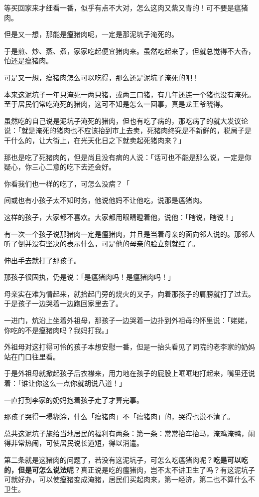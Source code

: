 \documentclass[UTF8]{ctexart}
\begin{document}
等买回家来才细看一番，似乎有点不大对，怎么这肉又紫又青的！可不要是瘟猪肉。

但是又一想，那能是瘟猪肉呢，一定是那泥坑子淹死的。

于是煎、炒、蒸、煮，家家吃起便宜猪肉来。虽然吃起来了，但就总觉得不大香，怕还是瘟猪肉。

可是又一想，瘟猪肉怎么可以吃得，那么还是泥坑子淹死的吧！

本来这泥坑子一年只淹死一两只猪，或两三口猪，有几年还连一个猪也没有淹死。至于居民们常吃淹死的猪肉，这可不知是怎么一回事，真是龙王爷晓得。

虽然吃的自己说是泥坑子淹死的猪肉，但也有吃了病的，那吃病了的就大发议论说：「就是淹死的猪肉也不应该抬到市上去卖，死猪肉终究是不新鲜的，税局子是干什么的，让大街上，在光天化日之下就卖起死猪肉来？」

那也是吃了死猪肉的，但是尚且没有病的人说：「话可也不能是那么说，一定是你疑心，你三心二意的吃下去还会好。

你看我们也一样的吃了，可怎么没病？「

间或也有小孩子太不知时务，他说他妈不让他吃，说那是瘟猪肉。

这样的孩子，大家都不喜欢。大家都用眼睛瞪着他，说他：「瞎说，瞎说！」

有一次一个孩子说那猪肉一定是瘟猪肉，并且是当着母亲的面向邻人说的。那邻人听了倒并没有坚决的表示什么，可是他的母亲的脸立刻就红了。

伸出手去就打了那孩子。

那孩子很固执，仍是说：「是瘟猪肉吗！是瘟猪肉吗！」

母亲实在难为情起来，就拾起门旁的烧火的叉子，向着那孩子的肩膀就打了过去。于是孩子一边哭着一边跑回家里去了。

一进门，炕沿上坐着外祖母，那孩子一边哭着一边扑到外祖母的怀里说：「姥姥，你吃的不是瘟猪肉吗？我妈打我。」

外祖母对这打得可怜的孩子本想安慰一番，但是一抬头看见了同院的老李家的奶妈站在门口往里看。

于是外祖母就掀起孩子后衣襟来，用力地在孩子的屁股上哐哐地打起来，嘴里还说着：「谁让你这么一点你就胡说八道！」

一直打到李家的奶妈抱着孩子走了才算完事。

那孩子哭得一塌糊涂，什么「瘟猪肉」不「瘟猪肉」的，哭得也说不清了。

总共这泥坑子施给当地居民的福利有两条：第一条：常常抬车抬马，淹鸡淹鸭，闹得非常热闹，可使居民说长道短，得以消遣。

第二条就是这猪肉的问题了，若没有这泥坑子，可怎么吃瘟猪肉呢？\textbf{吃是可以吃的，但是可怎么说法呢}？真正说是吃的瘟猪肉，岂不太不讲卫生了吗？有这泥坑子可就好办，可以使瘟猪变成淹猪，居民们买起肉来，第一经济，第二也不算什么不卫生。
\end{document}
